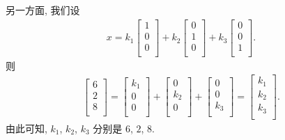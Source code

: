 \documentclass[../libro.tex]{subfiles}
\begin{document}
\begin{example}
    另一方面, 我们设
    \begin{align*}
        x =
        k_1
        \begin{bmatrix}
            1 \\ 0 \\ 0 \\
        \end{bmatrix}
        + k_2
        \begin{bmatrix}
            0 \\ 1 \\ 0 \\
        \end{bmatrix}
        + k_3
        \begin{bmatrix}
            0 \\ 0 \\ 1 \\
        \end{bmatrix}.
    \end{align*}
    则
    \begin{align*}
        \begin{bmatrix}
            6 \\ 2 \\ 8 \\
        \end{bmatrix}
        =
        \begin{bmatrix}
            k_1 \\ 0 \\ 0 \\
        \end{bmatrix}
        +
        \begin{bmatrix}
            0 \\ k_2 \\ 0 \\
        \end{bmatrix}
        +
        \begin{bmatrix}
            0 \\ 0 \\ k_3 \\
        \end{bmatrix}
        =
        \begin{bmatrix}
            k_1 \\ k_2 \\ k_3 \\
        \end{bmatrix}.
    \end{align*}
    由此可知,
    \(k_1\), \(k_2\), \(k_3\)
    分别是
    \(6\), \(2\), \(8\).
\end{example}
\end{document}
